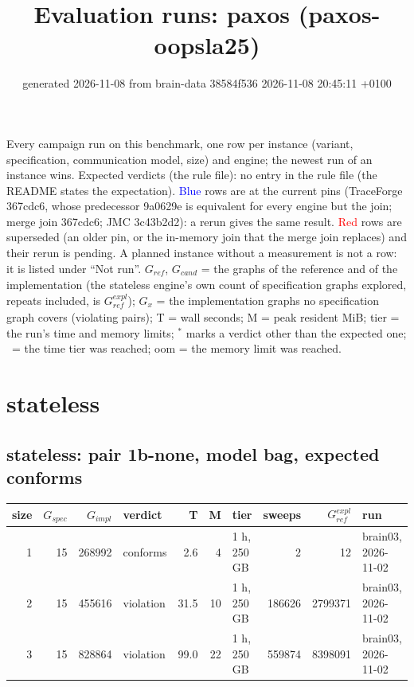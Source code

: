 \documentclass[10pt]{article}
\title{Evaluation runs: \textsf{paxos} (paxos-oopsla25)}
\author{}
\date{generated 2026-11-08 from brain-data 38584f536 2026-11-08 20:45:11 +0100}
\begin{document}
\maketitle\small
\noindent Every campaign run on this benchmark, one row per instance (variant, specification, communication model, size) and engine; the newest run of an instance wins. Expected verdicts (the rule file): no entry in the rule file (the README states the expectation). \textcolor{blue}{Blue} rows are at the current pins (TraceForge 367cdc6, whose predecessor 9a0629e is equivalent for every engine but the join; merge join 367cdc6; JMC 3c43b2d2): a rerun gives the same result. \textcolor{red}{Red} rows are superseded (an older pin, or the in-memory join that the merge join replaces) and their rerun is pending. A planned instance without a measurement is not a row: it is listed under ``Not run''. $G_{\mathit{ref}}$, $G_{\mathit{cand}}$ = the graphs of the reference and of the implementation (the stateless engine's own count of specification graphs explored, repeats included, is $G_{\mathit{ref}}^{\mathit{expl}}$); $G_x$ = the implementation graphs no specification graph covers (violating pairs); T = wall seconds; M = peak resident MiB; tier = the run's time and memory limits; $^{\ast}$ marks a verdict other than the expected one; \faClock\ = the time tier was reached; oom = the memory limit was reached.

\section*{stateless}
\subsection*{stateless: pair \textsf{1b-none}, model bag, expected conforms}
\begin{longtable}{@{}rrrlrrlrrl@{}}
\toprule
size & $G_{\mathit{spec}}$ & $G_{\mathit{impl}}$ & verdict & T & M & tier & sweeps & $G_{\mathit{ref}}^{\mathit{expl}}$ & run \\
\midrule
\endhead
\color{blue} 1 & 15 & 268992 & conforms & 2.6 & 4 & 1 h, 250 GB & 2 & 12 & brain03, 2026-11-02 \\
\color{blue} 2 & 15 & 455616 & violation & 31.5 & 10 & 1 h, 250 GB & 186626 & 2799371 & brain03, 2026-11-02 \\
\color{blue} 3 & 15 & 828864 & violation & 99.0 & 22 & 1 h, 250 GB & 559874 & 8398091 & brain03, 2026-11-02 \\
\bottomrule
\end{longtable}
\end{document}
